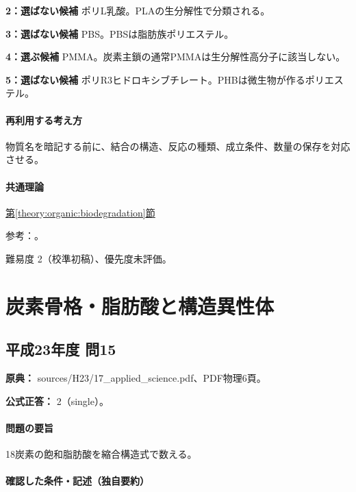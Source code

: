 \noindent\textbf{2：選ばない候補} ポリL乳酸。PLAの生分解性で分類される。\par

\noindent\textbf{3：選ばない候補} PBS。PBSは脂肪族ポリエステル。\par

\noindent\textbf{4：選ぶ候補} PMMA。炭素主鎖の通常PMMAは生分解性高分子に該当しない。\par

\noindent\textbf{5：選ばない候補} ポリR3ヒドロキシブチレート。PHBは微生物が作るポリエステル。\par

\paragraph{再利用する考え方} 物質名を暗記する前に、結合の構造、反応の種類、成立条件、数量の保存を対応させる。

\paragraph{共通理論} \hyperref[theory:organic:biodegradation]{第\ref*{theory:organic:biodegradation}節}

\par 参考：\cite{organic_jbpa,organic_jbpa_en}。

\par 難易度 2（校準初稿）、優先度未評価。

\section{炭素骨格・脂肪酸と構造異性体}

\subsection{平成23年度 問15}
\label{q:h23-reg-applied-15}

\noindent\textbf{原典：} sources/H23/17\_applied\_science.pdf、PDF物理6頁。

\textbf{公式正答：} 2（single）。

\paragraph{問題の要旨} 18炭素の飽和脂肪酸を縮合構造式で数える。

\paragraph{確認した条件・記述（独自要約）}\mbox{}\par

